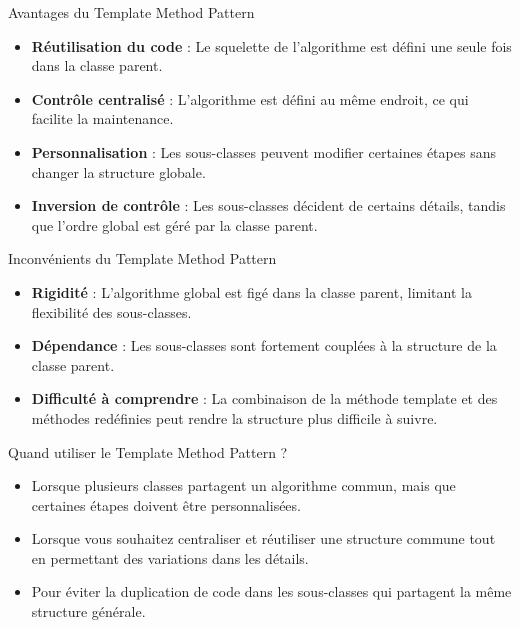 \documentclass[aspectratio=169]{beamer}
\begin{document}
  \begin{frame}{Avantages du Template Method Pattern}
    \begin{itemize}
        \item \textbf{Réutilisation du code} : Le squelette de l'algorithme est défini une seule fois dans la classe parent.
        \item \textbf{Contrôle centralisé} : L'algorithme est défini au même endroit, ce qui facilite la maintenance.
        \item \textbf{Personnalisation} : Les sous-classes peuvent modifier certaines étapes sans changer la structure globale.
        \item \textbf{Inversion de contrôle} : Les sous-classes décident de certains détails, tandis que l'ordre global est géré par la classe parent.
    \end{itemize}
  \end{frame}

  \begin{frame}{Inconvénients du Template Method Pattern}
    \begin{itemize}
        \item \textbf{Rigidité} : L'algorithme global est figé dans la classe parent, limitant la flexibilité des sous-classes.
        \item \textbf{Dépendance} : Les sous-classes sont fortement couplées à la structure de la classe parent.
        \item \textbf{Difficulté à comprendre} : La combinaison de la méthode template et des méthodes redéfinies peut rendre la structure plus difficile à suivre.
    \end{itemize}
  \end{frame}

  \begin{frame}{Quand utiliser le Template Method Pattern ?}
    \begin{itemize}
        \item Lorsque plusieurs classes partagent un algorithme commun, mais que certaines étapes doivent être personnalisées.
        \item Lorsque vous souhaitez centraliser et réutiliser une structure commune tout en permettant des variations dans les détails.
        \item Pour éviter la duplication de code dans les sous-classes qui partagent la même structure générale.
    \end{itemize}
  \end{frame}
\end{document}
